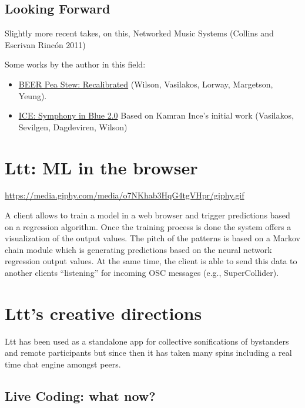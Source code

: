 \documentclass[11pt]{article}
\makeatletter
\newcommand{\citeprocitem}[2]{\hyper@linkstart{cite}{citeproc_bib_item_#1}#2\hyper@linkend}
\makeatother
\begin{document}
\subsection*{Looking Forward}
\label{sec:org2b7ff5b}
Slightly more recent takes, on this, Networked Music Systems (\citeprocitem{4}{Collins and Escrivan Rincón 2011})

Some works by the author in this field:
\begin{itemize}
\item \href{https://serkansevilgen.com/docs/01\_ICLC\_2021\_Sevilgen\_Vasilakos\_Wilson.pdf}{BEER Pea Stew: Recalibrated} (Wilson, Vasilakos, Lorway, Margetson, Yeung).
\item \href{https://serkansevilgen.com/docs/01\_ICLC\_2021\_Sevilgen\_Vasilakos\_Wilson.pdf}{ICE: Symphony in Blue 2.0} Based on Kamran Ince's initial work (Vasilakos, Sevilgen, Dagdeviren, Wilson)
\end{itemize}

\section*{Ltt: ML in the browser}
\label{sec:org97f803d}
\url{https://media.giphy.com/media/o7NKhab3HqG4tgVHpr/giphy.gif}

\begin{NOTES}
A client allows to train a model in a web browser and trigger predictions based on a regression algorithm. Once the training process is done the system offers a visualization of the output values. The pitch of the patterns is based on a Markov chain module which is  generating predictions based on the neural network regression output values. At the same time, the client is able to send this data to another clients ``listening'' for incoming OSC messages (e.g., SuperCollider).
\end{NOTES}
\section*{Ltt's creative directions}
\label{sec:orgebffa98}
\begin{NOTES}
Ltt has been used as a standalone app for collective sonifications of bystanders and remote participants but since then it has taken many spins including a real time chat engine amongst peers.
\end{NOTES}

\subsection*{Live Coding: what now?}
\label{sec:orgc40d63e}
\end{document}
